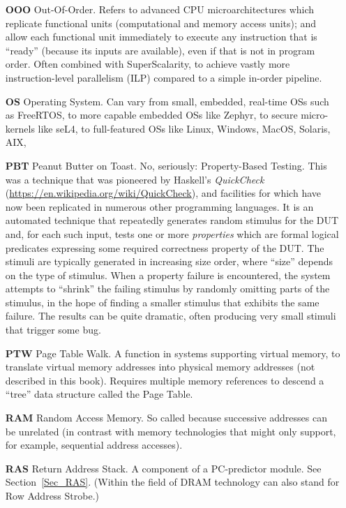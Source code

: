 \begin{itemize}
\item[\bf OOO] Out-Of-Order.  Refers to advanced CPU
  microarchitectures which replicate functional units (computational
  and memory access units); and allow each functional unit immediately
  to execute any instruction that is ``ready'' (because its inputs are
  available), even if that is not in program order.  Often combined
  with SuperScalarity, to achieve vastly more instruction-level
  parallelism (ILP) compared to a simple in-order pipeline.

\item[\bf OS] Operating System.  Can vary from small, embedded,
  real-time OSs such as FreeRTOS, to more capable embedded OSs like
  Zephyr, to secure micro-kernels like seL4, to full-featured OSs like
  Linux, Windows, MacOS, Solaris, AIX, {\etc}

\item[\bf PBT] Peanut Butter on Toast.  No, seriously: Property-Based
  Testing.  This was a technique that was pioneered by Haskell's
  \emph{QuickCheck} (\url{https://en.wikipedia.org/wiki/QuickCheck}),
  and facilities for which have now been replicated in numerous other
  programming languages.  It is an automated technique that repeatedly
  generates random stimulus for the DUT and, for each such input,
  tests one or more \emph{properties} which are formal logical
  predicates expressing some required correctness property of the DUT.
  The stimuli are typically generated in increasing size order, where
  ``size'' depends on the type of stimulus.  When a property failure
  is encountered, the system attempts to ``shrink'' the failing
  stimulus by randomly omitting parts of the stimulus, in the hope of
  finding a smaller stimulus that exhibits the same failure.  The
  results can be quite dramatic, often producing very small stimuli
  that trigger some bug.

\item[\bf PTW] Page Table Walk.  A function in systems supporting
  virtual memory, to translate virtual memory addresses into physical
  memory addresses (not described in this book).  Requires multiple
  memory references to descend a ``tree'' data structure called the
  Page Table.

\item[\bf RAM] Random Access Memory.  So called because successive
  addresses can be unrelated (in contrast with memory technologies
  that might only support, for example, sequential address accesses).

\item[\bf RAS] Return Address Stack.  A component of a PC-predictor
  module.  See Section~\ref{Sec_RAS}.  (Within the field of DRAM
  technology can also stand for Row Address Strobe.)


\end{itemize}
